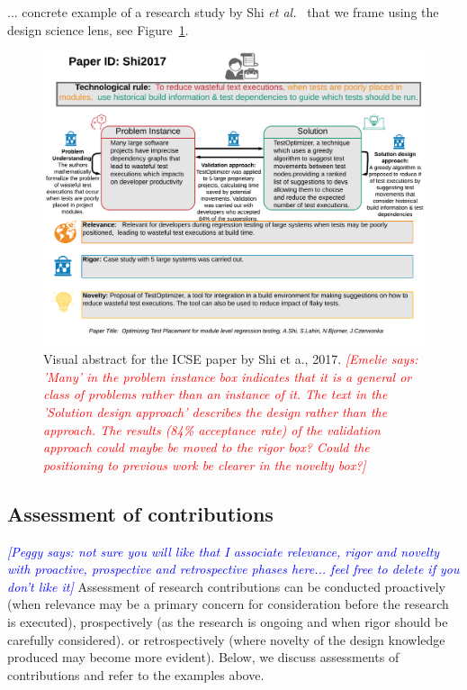 \documentclass[graybox]{svmult}
\newcommand{\emelie}[1]{\textcolor{red}{{\it [Emelie says: #1]}}}
\newcommand{\peggy}[1]{\textcolor{blue}{{\it [Peggy says: #1]}}}
\newcommand{\emelie}[1]{}
\newcommand{\peggy}[1]{}
\begin{document}
... concrete example of a research study by Shi \emph{et al.}~\cite{Shi2017} that we frame using the design science lens, see Figure~\ref{fig:VA-example}. 
\begin{figure}
  \includegraphics[width=1.0\textwidth]{Figures/Shi2017.png}
\caption{Visual abstract for the ICSE paper by Shi et a., 2017. \emelie{'Many' in the problem instance box indicates that it is a general or class of problems rather than an instance of it. The text in the 'Solution design approach' describes the design rather than the approach. The results (84\% acceptance rate) of the validation approach could maybe be moved to the rigor box? Could the positioning to previous work be clearer in the novelty box?}}
\label{fig:VA-example}       %
\end{figure}


\subsection{Assessment of contributions}
\label{sec:assessment}

\peggy{not sure you will like that I associate relevance, rigor and novelty with proactive, prospective and retrospective phases here... feel free to delete if you don't like it}
Assessment of research contributions can be conducted proactively (when relevance may be a primary concern for consideration before the research is executed), prospectively (as the research is ongoing and when rigor should be carefully considered). or retrospectively (where novelty of the design knowledge produced may become more evident).
Below, we discuss assessments of contributions and refer to the examples above.
\end{document}
